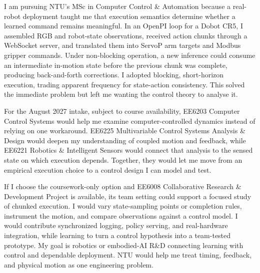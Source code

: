 I am pursuing NTU's MSc in Computer Control \& Automation because a real-robot deployment taught me that execution semantics determine whether a learned command remains meaningful. In an OpenPI loop for a Dobot CR5, I assembled RGB and robot-state observations, received action chunks through a WebSocket server, and translated them into ServoP arm targets and Modbus gripper commands. Under non-blocking operation, a new inference could consume an intermediate in-motion state before the previous chunk was complete, producing back-and-forth corrections. I adopted blocking, short-horizon execution, trading apparent frequency for state-action consistency. This solved the immediate problem but left me wanting the control theory to analyse it.

For the August 2027 intake, subject to course availability, EE6203 Computer Control Systems would help me examine computer-controlled dynamics instead of relying on one workaround. EE6225 Multivariable Control Systems Analysis \& Design would deepen my understanding of coupled motion and feedback, while EE6221 Robotics \& Intelligent Sensors would connect that analysis to the sensed state on which execution depends. Together, they would let me move from an empirical execution choice to a control design I can model and test.

If I choose the coursework-only option and EE6008 Collaborative Research \& Development Project is available, its team setting could support a focused study of chunked execution. I would vary state-sampling points or completion rules, instrument the motion, and compare observations against a control model. I would contribute synchronized logging, policy serving, and real-hardware integration, while learning to turn a control hypothesis into a team-tested prototype. My goal is robotics or embodied-AI R\&D connecting learning with control and dependable deployment. NTU would help me treat timing, feedback, and physical motion as one engineering problem.
